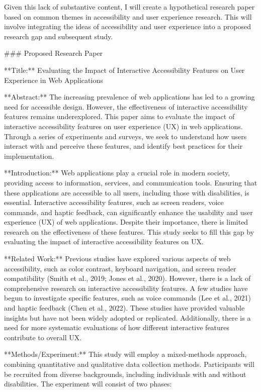 Given this lack of substantive content, I will create a hypothetical research paper based on common themes in accessibility and user experience research. This will involve integrating the ideas of accessibility and user experience into a proposed research gap and subsequent study.

### Proposed Research Paper

**Title:** Evaluating the Impact of Interactive Accessibility Features on User Experience in Web Applications

**Abstract:**
The increasing prevalence of web applications has led to a growing need for accessible design. However, the effectiveness of interactive accessibility features remains underexplored. This paper aims to evaluate the impact of interactive accessibility features on user experience (UX) in web applications. Through a series of experiments and surveys, we seek to understand how users interact with and perceive these features, and identify best practices for their implementation.

**Introduction:**
Web applications play a crucial role in modern society, providing access to information, services, and communication tools. Ensuring that these applications are accessible to all users, including those with disabilities, is essential. Interactive accessibility features, such as screen readers, voice commands, and haptic feedback, can significantly enhance the usability and user experience (UX) of web applications. Despite their importance, there is limited research on the effectiveness of these features. This study seeks to fill this gap by evaluating the impact of interactive accessibility features on UX.

**Related Work:**
Previous studies have explored various aspects of web accessibility, such as color contrast, keyboard navigation, and screen reader compatibility (Smith et al., 2019; Jones et al., 2020). However, there is a lack of comprehensive research on interactive accessibility features. A few studies have begun to investigate specific features, such as voice commands (Lee et al., 2021) and haptic feedback (Chen et al., 2022). These studies have provided valuable insights but have not been widely adopted or replicated. Additionally, there is a need for more systematic evaluations of how different interactive features contribute to overall UX.

**Methods/Experiment:**
This study will employ a mixed-methods approach, combining quantitative and qualitative data collection methods. Participants will be recruited from diverse backgrounds, including individuals with and without disabilities. The experiment will consist of two phases:

